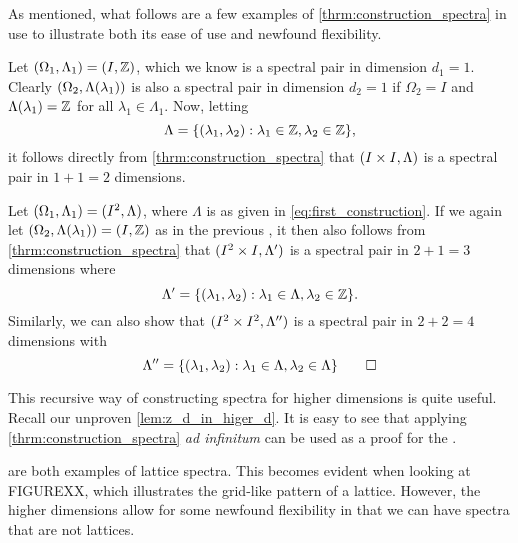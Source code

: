 \documentclass[../thesis.tex]{subfiles}
\begin{document}
As mentioned, what follows are a few examples of \cref{thrm:construction_spectra} in use to illustrate both its ease of use and newfound flexibility. 
\begin{example}\label{exmp:first_construction}
    Let $(\Omega_1,\Lambda_1)=(I, \mathbb{Z})$, which we know is a spectral pair in dimension $d_1=1$. Clearly $(\Omega_2,\Lambda(\lambda_1))$ is also a spectral pair in dimension $d_2=1$ if $\Omega_2=I$ and $\Lambda(\lambda_1) = \mathbb{Z}$ for all $\lambda_1 \in \Lambda_1$. Now, letting 
    \begin{equation}\label{eq:first_construction}
        \Lambda  = \{(\lambda_1,\lambda_2): \lambda_1 \in \mathbb{Z}, \lambda_2 \in \mathbb{Z} \},
    \end{equation}
    it follows directly from \cref{thrm:construction_spectra} that $(I \times I, \Lambda)$ is a spectral pair in $1+1=2$ dimensions.
\end{example}

\begin{example}\label{exmp:second_construction}
    Let $(\Omega_1,\Lambda_1) = (I^2, \Lambda)$, where $\Lambda$ is as given in \cref{eq:first_construction}. If we again let 
    $(\Omega_2,\Lambda(\lambda_1)) = (I, \mathbb{Z})$ as in the previous , it then also follows from \cref{thrm:construction_spectra} that $(I^2 \times I, \Lambda')$ is a spectral pair in $2+1=3$ dimensions where 
    \begin{equation*}
        \Lambda'=\{(\lambda_1,\lambda_2): \lambda_1 \in \Lambda, \lambda_2 \in \mathbb{Z} \}.
    \end{equation*}
    Similarly, we can also show that $(I^2 \times I^2, \Lambda'')$ is a spectral pair in $2+2=4$ dimensions with
    \begin{equation*}
        \Lambda''=\{(\lambda_1,\lambda_2): \lambda_1 \in \Lambda, \lambda_2 \in \Lambda\} \qedhere
    \end{equation*}
\end{example}

This recursive way of constructing spectra for higher dimensions is quite useful. Recall our unproven \cref{lem:z_d_in_higer_d}. It is easy to see that applying \cref{thrm:construction_spectra} \emph{ad infinitum} can be used as a proof for the .

 are both examples of lattice spectra. This becomes evident when looking at FIGUREXX, which illustrates the grid-like pattern of a lattice. However, the higher dimensions allow for some newfound flexibility in that we can have spectra that are not lattices. 
\end{document}
